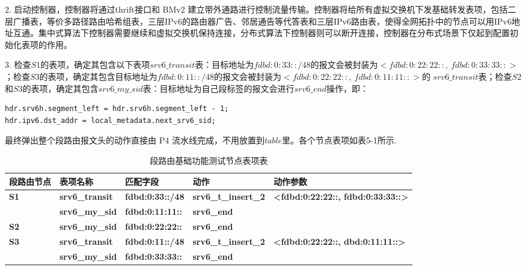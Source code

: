 2. 启动控制器，控制器将通过thrift接口和 \gls*{BMv2} 建立带外通路进行控制流量传输。控制器将给所有虚拟交换机下发基础转发表项，包括二层广播表，等价多路径路由哈希组表，三层IPv6的路由器广告、邻居通告等代答表和三层IPv6路由表，使得全网拓扑中的节点可以用IPv6地址互通。集中式算法下控制器需要继续和虚拟交换机保持连接，分布式算法下控制器则可以断开连接，控制器在分布式场景下仅起到配置初始化表项的作用。

3. 检查$S1$的表项，确定其包含以下表项$srv6\_transit$表：目标地址为$fdbd:0:33::/48$的报文会被封装为$<fdbd:0:22:22::,\ fdbd:0:33:33::>$；检查$S3$的表项，确定其包含目标地址为$fdbd:0:11::/48$的报文会被封装为$<fdbd:0:22:22::,\ fdbd:0:11:11::>$的 $srv6\_transit$表；检查$S2$和$S3$的表项，确定其包含$srv6\_my\_sid$表：目标地址为自己段标签的报文会进行$srv6\_end$操作，即：

\begin{lstlisting}
hdr.srv6h.segment_left = hdr.srv6h.segment_left - 1;
hdr.ipv6.dst_addr = local_metadata.next_srv6_sid;
\end{lstlisting}


最终弹出整个段路由报文头的动作直接由 \gls*{P4} 流水线完成，不用放置到$table$里。各个节点表项如表5-1所示.

\begin{table}[]
\begin{tabular}{|l|l|l|l|l|}
\hline
段路由节点 & 表项名称 & 匹配字段 & 动作 & 动作参数 \\ \hline
\multirow{2}{*}{\textbf{S1}} & \textbf{srv6\_transit} & \textbf{fdbd:0:33::/48} & \textbf{srv6\_t\_insert\_2} & \textbf{\textless{}fdbd:0:22:22::, fdbd:0:33:33::\textgreater{}} \\ \cline{2-5} 
    & \textbf{srv6\_my\_sid} & \textbf{fdbd:0:11:11::} & \textbf{srv6\_end} &  \\ \hline
\textbf{S2} & \textbf{srv6\_my\_sid} & \textbf{fdbd:0:22:22::} & \textbf{srv6\_end} &  \\ \hline
\multirow{2}{*}{\textbf{S3}} & \textbf{srv6\_transit} & \textbf{fdbd:0:11::/48} & \textbf{srv6\_t\_insert\_2} & \textbf{\textless{}fdbd:0:22:22::, dbd:0:11:11::\textgreater{}} \\ \cline{2-5} 
    & \textbf{srv6\_my\_sid} & \textbf{fdbd:0:33:33::} & \textbf{srv6\_end} &  \\ \hline
\end{tabular}
\caption{段路由基础功能测试节点表项表}
\label{table-sr-entries}
\end{table}

